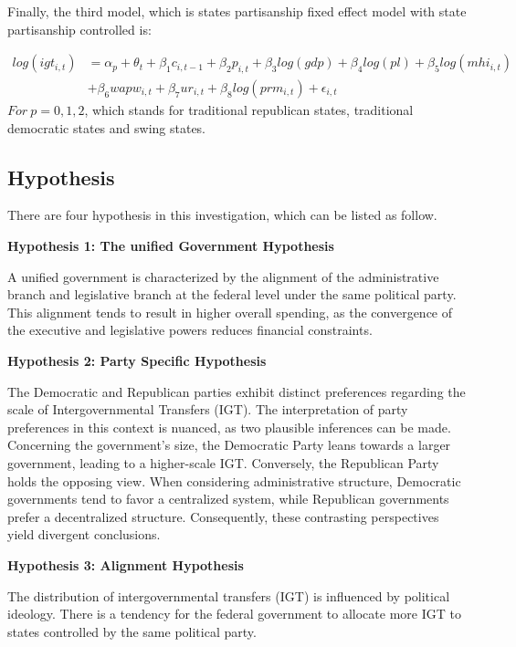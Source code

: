 \documentclass[man]{apa7}
\begin{document}
Finally, the third model, which is states partisanship fixed effect model with state partisanship controlled is:

\begin{equation}
  \begin{split}
    log(igt_{i,t}) & = \alpha_p + \theta_t + \beta_1 c_{i,t-1} + \beta_2 p_{i,t} + \beta_3 log(gdp) + \beta_4 log(pl) + \beta_5 log(mhi_{i,t}) \\
    &+ \beta_6 wapw_{i,t} + \beta_7 ur_{i,t} +\beta_8 log(prm_{i,t}) + \epsilon_{i,t}
  \end{split}
\end{equation}
$For\ p = 0,1,2$, which stands for traditional republican states, traditional democratic states and swing states.

\subsection{Hypothesis}

There are four hypothesis in this investigation, which can be listed as follow.

\textbf{Hypothesis 1: The unified Government Hypothesis}

A unified government is characterized by the alignment of the administrative branch and legislative branch at the federal level under the same political party. This alignment tends to result in higher overall spending, as the convergence of the executive and legislative powers reduces financial constraints.

\textbf{Hypothesis 2: Party Specific Hypothesis}

The Democratic and Republican parties exhibit distinct preferences regarding the scale of Intergovernmental Transfers (IGT). The interpretation of party preferences in this context is nuanced, as two plausible inferences can be made. Concerning the government's size, the Democratic Party leans towards a larger government, leading to a higher-scale IGT. Conversely, the Republican Party holds the opposing view. When considering administrative structure, Democratic governments tend to favor a centralized system, while Republican governments prefer a decentralized structure. Consequently, these contrasting perspectives yield divergent conclusions.

\textbf{Hypothesis 3: Alignment Hypothesis}

The distribution of intergovernmental transfers (IGT) is influenced by political ideology. There is a tendency for the federal government to allocate more IGT to states controlled by the same political party.
\end{document}
